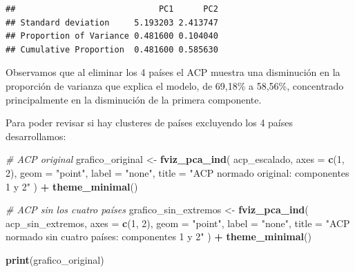\documentclass[
]{article}
\newenvironment{Shaded}{\begin{snugshade}}{\end{snugshade}}
\newcommand{\AttributeTok}[1]{\textcolor[rgb]{0.13,0.29,0.53}{#1}}
\newcommand{\CommentTok}[1]{\textcolor[rgb]{0.56,0.35,0.01}{\textit{#1}}}
\newcommand{\DecValTok}[1]{\textcolor[rgb]{0.00,0.00,0.81}{#1}}
\newcommand{\FunctionTok}[1]{\textcolor[rgb]{0.13,0.29,0.53}{\textbf{#1}}}
\newcommand{\NormalTok}[1]{#1}
\newcommand{\OtherTok}[1]{\textcolor[rgb]{0.56,0.35,0.01}{#1}}
\newcommand{\SpecialCharTok}[1]{\textcolor[rgb]{0.81,0.36,0.00}{\textbf{#1}}}
\newcommand{\StringTok}[1]{\textcolor[rgb]{0.31,0.60,0.02}{#1}}
\newcounter{none} %
\begin{document}
\begin{Shaded}
\end{Shaded}

\begin{verbatim}
##                             PC1      PC2
## Standard deviation     5.193203 2.413747
## Proportion of Variance 0.481600 0.104040
## Cumulative Proportion  0.481600 0.585630
\end{verbatim}

Observamos que al eliminar los 4 países el ACP muestra una disminución
en la proporción de varianza que explica el modelo, de 69,18\% a
58,56\%, concentrado principalmente en la disminución de la primera
componente.

Para poder revisar si hay clusteres de países excluyendo los 4 países
desarrollamos:

\begin{Shaded}
\begin{Highlighting}[]
\CommentTok{\# ACP original}
\NormalTok{grafico\_original }\OtherTok{\textless{}{-}} \FunctionTok{fviz\_pca\_ind}\NormalTok{(}
\NormalTok{  acp\_escalado,}
  \AttributeTok{axes =} \FunctionTok{c}\NormalTok{(}\DecValTok{1}\NormalTok{, }\DecValTok{2}\NormalTok{),}
  \AttributeTok{geom =} \StringTok{"point"}\NormalTok{,}
  \AttributeTok{label =} \StringTok{"none"}\NormalTok{,}
  \AttributeTok{title =} \StringTok{"ACP normado original: componentes 1 y 2"}
\NormalTok{) }\SpecialCharTok{+}
  \FunctionTok{theme\_minimal}\NormalTok{()}

\CommentTok{\# ACP sin los cuatro países}
\NormalTok{grafico\_sin\_extremos }\OtherTok{\textless{}{-}} \FunctionTok{fviz\_pca\_ind}\NormalTok{(}
\NormalTok{  acp\_sin\_extremos,}
  \AttributeTok{axes =} \FunctionTok{c}\NormalTok{(}\DecValTok{1}\NormalTok{, }\DecValTok{2}\NormalTok{),}
  \AttributeTok{geom =} \StringTok{"point"}\NormalTok{,}
  \AttributeTok{label =} \StringTok{"none"}\NormalTok{,}
  \AttributeTok{title =} \StringTok{"ACP normado sin cuatro países: componentes 1 y 2"}
\NormalTok{) }\SpecialCharTok{+}
  \FunctionTok{theme\_minimal}\NormalTok{()}

\FunctionTok{print}\NormalTok{(grafico\_original)}
\end{Highlighting}
\end{Shaded}
\end{document}
